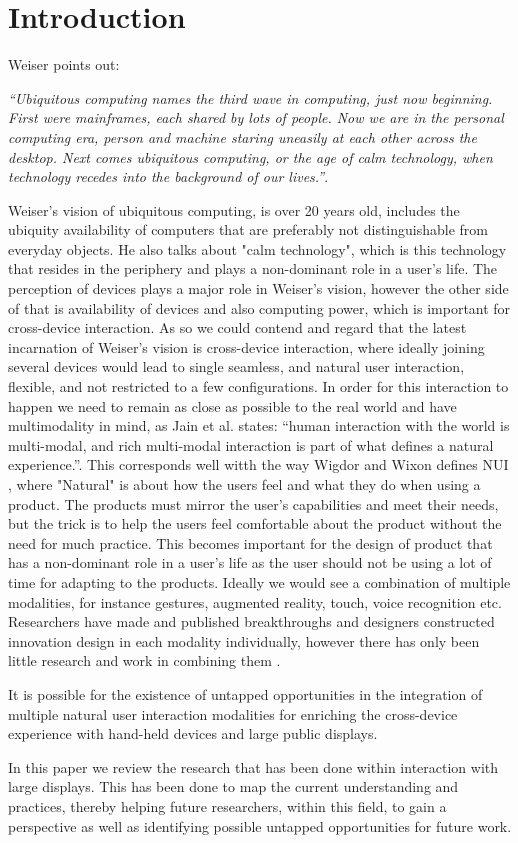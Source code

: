 \section{Introduction}
Weiser\cite{Weiser:1991} points out:
 
{\em``Ubiquitous computing names the third wave in computing, just now beginning. First were mainframes, each shared by lots of people. Now we are in the personal computing era, person and machine staring uneasily at each other across the desktop. Next comes ubiquitous computing, or the age of calm technology, when technology recedes into the background of our lives.''}.

Weiser's vision of ubiquitous computing, is over 20 years old, includes the ubiquity availability of computers that are preferably not distinguishable from everyday objects. He also talks about "calm technology", which is this technology that resides in the periphery and plays a non-dominant role in a user's life. The perception of devices plays a major role in Weiser's vision, however the other side of that is availability of devices and also computing power, which is important for cross-device interaction. As so we could contend and regard that the latest incarnation of Weiser's vision is cross-device interaction, where ideally joining several devices would lead to single seamless, and natural user interaction, flexible, and not restricted to a few configurations\cite{Radle:2015}.
In order for this interaction to happen we need to remain as close as possible to the real world and have multimodality in mind, as Jain et al. states: ``human interaction with the world is multi-modal, and rich multi-modal interaction is part of what defines a natural experience.''\cite{Jain:2011}. 
This corresponds well witth the way Wigdor and Wixon defines NUI , where "Natural" is about how the users feel and what they do when using a product. The products must mirror the user's capabilities and meet their needs, but the trick is to help the users feel comfortable about the product without the need for much practice\cite{Wigdor:2011}. This becomes important for the design of product that has a non-dominant role in a user's life as the user should not be using a lot of time for adapting to the products.   
Ideally we would see a combination of multiple modalities, for instance gestures, augmented reality, touch, voice recognition etc. 
Researchers have made and published breakthroughs and designers constructed innovation design in each modality individually, however there has only been little research and work in combining them \cite{Jain:2011}. 

It is possible for the existence of untapped opportunities in the integration of multiple natural user interaction modalities for enriching the cross-device experience with hand-held devices and large public displays. 

In this paper we review the research that has been done within interaction with large displays. 
This has been done to map the current understanding and practices, thereby helping future researchers, within this field, to gain a perspective as well as identifying possible untapped opportunities for future work.